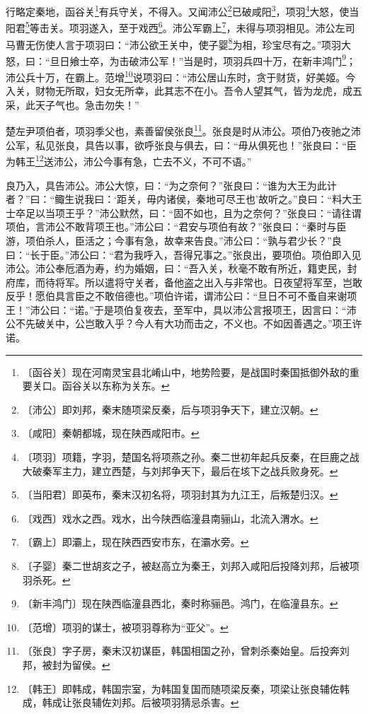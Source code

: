 \documentclass[12pt,UTF-8,openany,a4]{ctexbook}
\begin{document}
\begin{large}
    
    行略定秦地，函谷关\footnote{〔函谷关〕\yiwen 现在河南灵宝县北崤山中，地势险要，是战国时秦国抵御外敌的重要关口。函谷关以东称为关东。}有兵守关，不得入。又闻沛公\footnote{〔沛公〕\yiwen 即刘邦，秦末随项梁反秦，后与项羽争天下，建立汉朝。}已破咸阳\footnote{〔咸阳〕\yiwen 秦朝都城，现在陕西咸阳市。}，项羽\footnote{〔项羽〕\yiwen 项籍，字羽，楚国名将项燕之孙。秦二世初年起兵反秦，在巨鹿之战大破秦军主力，建立西楚，与刘邦争天下，最后在垓下之战兵败身死。}大怒，使当阳君\footnote{〔当阳君〕\yiwen 即英布，秦末汉初名将，项羽封其为九江王，后叛楚归汉。}等击关。项羽遂入，至于戏西\footnote{〔戏西〕\yiwen 戏水之西。戏水，出今陕西临潼县南骊山，北流入渭水。}。沛公军霸上\footnote{〔霸上〕\yiwen 即灞上，现在陕西西安市东，在灞水旁。}，未得与项羽相见。沛公左司马曹无伤使人言于项羽曰：“沛公欲王关中，使子婴\footnote{〔子婴〕\yiwen 秦二世胡亥之子，被赵高立为秦王，刘邦入咸阳后投降刘邦，后被项羽杀死。}为相，珍宝尽有之。”项羽大怒，曰：“旦日飨士卒，为击破沛公军！”当是时，项羽兵四十万，在新丰鸿门\footnote{〔新丰鸿门〕\yiwen 现在陕西临潼县西北，秦时称骊邑。鸿门，在临潼县东。}；沛公兵十万，在霸上。范增\footnote{〔范增〕\yiwen 项羽的谋士，被项羽尊称为“亚父”。}说项羽曰：“沛公居山东时，贪于财货，好美姬。今入关，财物无所取，妇女无所幸，此其志不在小。吾令人望其气，皆为龙虎，成五采，此天子气也。急击勿失！”
    
    楚左尹项伯者，项羽季父也，素善留侯张良\footnote{〔张良〕\yiwen 字子房，秦末汉初谋臣，韩国相国之孙，曾刺杀秦始皇。后投奔刘邦，被封为留侯。}。张良是时从沛公。项伯乃夜驰之沛公军，私见张良，具告以事，欲呼张良与俱去，曰：“毋从俱死也！”张良曰：“臣为韩王\footnote{〔韩王〕\yiwen 即韩成，韩国宗室，为韩国复国而随项梁反秦，项梁让张良辅佐韩成，韩成让张良辅佐刘邦。后被项羽猜忌杀害。}送沛公，沛公今事有急，亡去不义，不可不语。”
    
    良乃入，具告沛公。沛公大惊，曰：“为之奈何？”张良曰：“谁为大王为此计者？”曰：“鲰生说我曰：‘距关，毋内诸侯，秦地可尽王也’故听之。”良曰：“料大王士卒足以当项王乎？”沛公默然，曰：“固不如也，且为之奈何？”张良曰：“请往谓项伯，言沛公不敢背项王也。”沛公曰：“君安与项伯有故？”张良曰：“秦时与臣游，项伯杀人，臣活之；今事有急，故幸来告良。”沛公曰：“孰与君少长？”良曰：“长于臣。”沛公曰：“君为我呼入，吾得兄事之。”张良出，要项伯。项伯即入见沛公。沛公奉卮酒为寿，约为婚姻，曰：“吾入关，秋毫不敢有所近，籍吏民，封府库，而待将军。所以遣将守关者，备他盗之出入与非常也。日夜望将军至，岂敢反乎！愿伯具言臣之不敢倍德也。”项伯许诺，谓沛公曰：“旦日不可不蚤自来谢项王！”沛公曰：“诺。”于是项伯复夜去，至军中，具以沛公言报项王，因言曰：“沛公不先破关中，公岂敢入乎？今人有大功而击之，不义也。不如因善遇之。”项王许诺。
    

\end{large}
\end{document}
